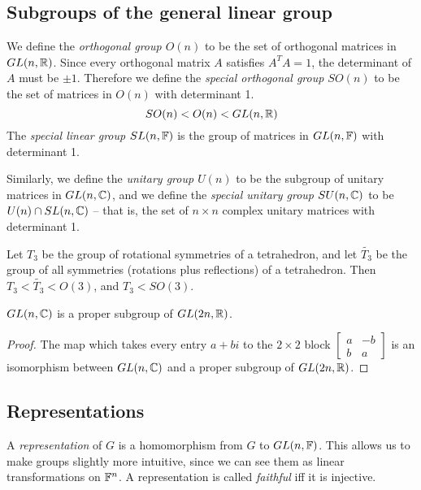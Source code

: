 \documentclass[class=article, crop=false]{standalone}
\begin{document}
\subsection{Subgroups of the general linear group}
We define the \emph{orthogonal group $O(n)$} to be the set of orthogonal matrices in $GL(n,\mathbb{R})$. Since every orthogonal matrix $A$ satisfies $A^TA=1$, the determinant of $A$ must be $\pm 1$. Therefore we define the \emph{special orthogonal group $SO(n)$} to be the set of matrices in $O(n)$ with determinant 1.
\[ SO(n) < O(n) < GL(n,\mathbb{R}) \]
The \emph{special linear group $SL(n,\mathbb{F})$} is the group of matrices in $GL(n,\mathbb{F})$ with determinant 1.
\par
Similarly, we define the \emph{unitary group $U(n)$} to be the subgroup of unitary matrices in $GL(n,\mathbb{C})$, and we define the \emph{special unitary group $SU(n,\mathbb{C})$} to be $U(n) \cap SL(n,\mathbb{C})$ -- that is, the set of $n \times n$ complex unitary matrices with determinant 1.
\begin{example}
    Let $T_3$ be the group of rotational symmetries of a tetrahedron, and let $\widetilde{T_3}$ be the group of all symmetries (rotations plus reflections) of a tetrahedron. Then $T_3 < \widetilde{T_3} < O(3)$, and $T_3 < SO(3)$.
\end{example}
\begin{prop}
    $GL(n,\mathbb{C})$ is a proper subgroup of $GL(2n,\mathbb{R})$.
\end{prop}
\begin{proof}
    The map which takes every entry $a+bi$ to the $2 \times 2$ block $\begin{bmatrix}
        a & -b \\
        b & a
    \end{bmatrix}$ is an isomorphism between $GL(n,\mathbb{C})$ and a proper subgroup of $GL(2n,\mathbb{R})$.
\end{proof}

\subsection{Representations}
A \emph{representation} of $G$ is a homomorphism from $G$ to $GL(n,\mathbb{F})$. This allows us to make groups slightly more intuitive, since we can see them as linear transformations on $\mathbb{F}^n$. A representation is called \emph{faithful} iff it is injective.
\end{document}
